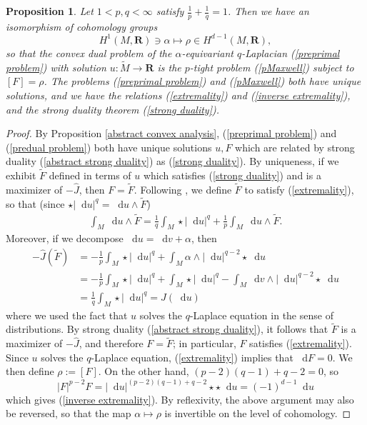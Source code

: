 \documentclass[reqno,11pt]{amsart}
\newcommand{\RR}{\mathbf{R}}
\newcommand*\dif{\mathop{}\!\mathrm{d}}
\newtheorem{proposition}[theorem]{Proposition}
\theoremstyle{definition}
\numberwithin{equation}{section}
\begin{document}
\begin{proposition}\label{convex duality}
Let $1 < p, q < \infty$ satisfy $\frac{1}{p} + \frac{1}{q} = 1$.
Then we have an isomorphism of cohomology groups
$$H^1(M, \RR) \ni \alpha \mapsto \rho \in H^{d - 1}(M, \RR),$$
so that the convex dual problem of the $\alpha$-equivariant $q$-Laplacian (\ref{preprimal problem}) with solution $u: \tilde M \to \RR$ is the $p$-tight problem (\ref{pMaxwell}) subject to $[F] = \rho$.
The problems (\ref{preprimal problem}) and (\ref{pMaxwell}) both have unique solutions, and we have the relations (\ref{extremality}) and (\ref{inverse extremality}), and the strong duality theorem (\ref{strong duality}).
\end{proposition}
\begin{proof}
By Proposition \ref{abstract convex analysis}, (\ref{preprimal problem}) and (\ref{predual problem}) both have unique solutions $u, F$ which are related by strong duality (\ref{abstract strong duality}) as (\ref{strong duality}).
By uniqueness, if we exhibit $\tilde F$ defined in terms of $u$ which satisfies (\ref{strong duality}) and is a maximizer of $-\hat J$, then $F = \tilde F$.
Following \cite[Chapter IV, (2.12)]{Ekeland99}, we define $\tilde F$ to satisfy (\ref{extremality}), so that (since $\star |\dif u|^q = \dif u \wedge \tilde F$)
\begin{align*}
\int_M \dif u \wedge \tilde F 
= \frac{1}{q} \int_M \star |\dif u|^q + \frac{1}{p} \int_M \dif u \wedge \tilde F.
\end{align*}
Moreover, if we decompose $\dif u = \dif v + \alpha$, then
\begin{align*}
-\hat J(\tilde F)
&= -\frac{1}{p} \int_M \star |\dif u|^q + \int_M \alpha \wedge |\dif u|^{q - 2} \star \dif u \\
&= -\frac{1}{p} \int_M \star |\dif u|^q + \int_M \star |\dif u|^q - \int_M \dif v \wedge |\dif u|^{q - 2} \star \dif u \\
&= \frac{1}{q} \int_M \star |\dif u|^q = J(\dif u)
\end{align*}
where we used the fact that $u$ solves the $q$-Laplace equation in the sense of distributions.
By strong duality (\ref{abstract strong duality}), it follows that $\tilde F$ is a maximizer of $-\hat J$, and therefore $F = \tilde F$; in particular, $F$ satisfies (\ref{extremality}).
Since $u$ solves the $q$-Laplace equation, (\ref{extremality}) implies that $\dif F = 0$.
We then define $\rho := [F]$.
On the other hand, $(p - 2)(q - 1) + q - 2 = 0$, so
$$|F|^{p - 2} F = |\dif u|^{(p - 2)(q - 1) + q - 2} \star \star \dif u = (-1)^{d - 1} \dif u$$
which gives (\ref{inverse extremality}).
By reflexivity, the above argument may also be reversed, so that the map $\alpha \mapsto \rho$ is invertible on the level of cohomology.
\end{proof}
\end{document}
